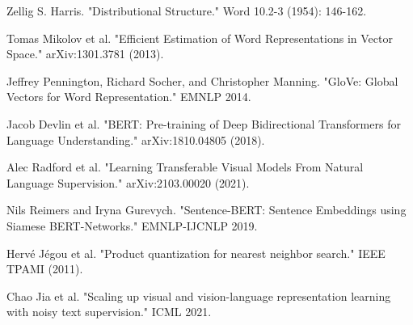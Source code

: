 \documentclass{article}
\begin{document}
\begin{thebibliography}{9}
Zellig S. Harris. "Distributional Structure." Word 10.2-3 (1954): 146-162.

Tomas Mikolov et al. "Efficient Estimation of Word Representations in Vector Space." arXiv:1301.3781 (2013).

Jeffrey Pennington, Richard Socher, and Christopher Manning. "GloVe: Global Vectors for Word Representation." EMNLP 2014.

Jacob Devlin et al. "BERT: Pre-training of Deep Bidirectional Transformers for Language Understanding." arXiv:1810.04805 (2018).

Alec Radford et al. "Learning Transferable Visual Models From Natural Language Supervision." arXiv:2103.00020 (2021).

Nils Reimers and Iryna Gurevych. "Sentence-BERT: Sentence Embeddings using Siamese BERT-Networks." EMNLP-IJCNLP 2019.

Hervé Jégou et al. "Product quantization for nearest neighbor search." IEEE TPAMI (2011).

Chao Jia et al. "Scaling up visual and vision-language representation learning with noisy text supervision." ICML 2021.
\end{thebibliography}
\end{document}
